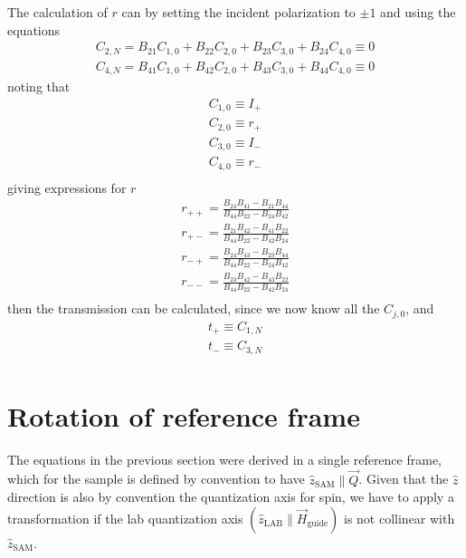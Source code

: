 \documentclass[%
 reprint,
 amsmath,
 amssymb,
 aps,
 prl,
 lengthcheck,%
]{revtex4-1}
\begin{document}
The calculation of $r$ can by setting 
the incident polarization to $\pm 1$ and using the equations
\begin{equation}
  \begin{array}{l}
    C_{2,N} = B_{21} C_{1,0} + B_{22} C_{2,0} + B_{23} C_{3,0} + B_{24} C_{4,0} \equiv 0\\
    C_{4,N} = B_{41} C_{1,0} + B_{42} C_{2,0} + B_{43} C_{3,0} + B_{44} C_{4,0} \equiv 0    
  \end{array}
\end{equation}
noting that
\begin{equation}
  \begin{array}{l}
    C_{1,0} \equiv I_+ \\
    C_{2,0} \equiv r_+ \\
    C_{3,0} \equiv I_- \\
    C_{4,0} \equiv r_- \\
  \end{array}
\end{equation}
giving expressions for $r$
\begin{equation}
  \begin{array}{l}
    r_{++} = \frac{B_{24}B_{41} - B_{21}B_{44}}{B_{44}B_{22} - B_{24}B_{42}}\\[0.3em]
    r_{+-} = \frac{B_{21}B_{42} - B_{41}B_{22}}{B_{44}B_{22} - B_{42}B_{24}}\\[0.3em]
    r_{-+} = \frac{B_{24}B_{43} - B_{23}B_{44}}{B_{44}B_{22} - B_{24}B_{42}}\\[0.3em]
    r_{--} = \frac{B_{23}B_{42} - B_{43}B_{22}}{B_{44}B_{22} - B_{42}B_{24}}\\[0.3em]
  \end{array}
\end{equation}
then the transmission can be calculated, since 
we now know all the $C_{j,0}$, and 
\begin{equation}
  \begin{array}{l}
    t_+ \equiv C_{1,N} \\
    t_- \equiv C_{3,N} \\
  \end{array}
\end{equation}


\section{Rotation of reference frame}

The equations in the previous section were derived in a single reference frame, 
which for the sample is defined by convention to have $\hat z_{\textrm{SAM}} \parallel \vec Q$.
Given that the $\hat z$ direction is also by convention the quantization axis 
for spin, we have to apply a transformation if the lab quantization axis 
$(\hat z_{\textrm {LAB}} \parallel \vec H_{\textrm{guide}})$ is not collinear with
$\hat z_{\textrm{SAM}}$.
\end{document}
